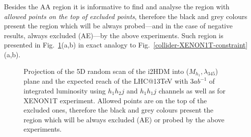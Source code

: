 \documentclass[12pt,a4paper]{article}
\newcommand {\blue} {\color{blue}}
\begin{document}
Besides the AA region it is informative to find and analyse the region
with {\it allowed points on the top of excluded points}, therefore the
black and grey colours
present the region which will be always 
probed{\blue ---and in the case of negative results, always excluded (AE)---}by the above experiments. 
Such region is presented in Fig.~\ref{collider-XENON1T-constraint-AE}(a,b)
in exact analogy to  Fig.~\ref{collider-XENON1T-constraint}(a,b).
%
\begin{figure}[htb]
\vskip -0.5cm
%
\vskip -0.3cm
\caption{Projection of the 5D random scan of the i2HDM into ($M_{h_1},\lambda_{345}$)
plane and the expected  reach of the LHC@13TeV with 3$ab^{-1}$ of integrated luminosity 
using  $h_1 h_2 j$  and  $h_1 h_1 j$ channels as well as for XENON1T experiment.
Allowed points are on the top of the excluded ones, therefore
the black and grey colours
present  the region which will be always excluded (AE)
or probed by the above experiments.
\label{collider-XENON1T-constraint-AE}} 
\end{figure}
\end{document}
